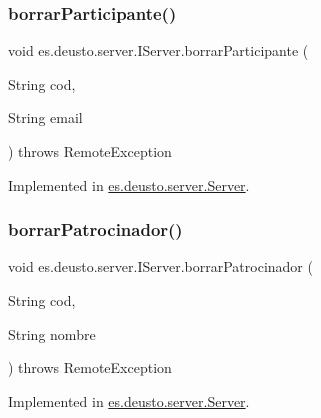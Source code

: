 \mbox{\label{interfacees_1_1deusto_1_1server_1_1_i_server_ac833d9018ade9c49677942317f270046}} 
\subsubsection{\texorpdfstring{borrarParticipante()}{borrarParticipante()}}
{\footnotesize\ttfamily void es.\+deusto.\+server.\+I\+Server.\+borrar\+Participante (\begin{DoxyParamCaption}\item[{String}]{cod,  }\item[{String}]{email }\end{DoxyParamCaption}) throws Remote\+Exception}



Implemented in \mbox{\hyperlink{classes_1_1deusto_1_1server_1_1_server_a60cba3edcdffc7f50d4fa1f55b54ce76}{es.\+deusto.\+server.\+Server}}.

\mbox{\label{interfacees_1_1deusto_1_1server_1_1_i_server_a905d4eb57bc276240c23f5ebb0f08bea}} 
\subsubsection{\texorpdfstring{borrarPatrocinador()}{borrarPatrocinador()}}
{\footnotesize\ttfamily void es.\+deusto.\+server.\+I\+Server.\+borrar\+Patrocinador (\begin{DoxyParamCaption}\item[{String}]{cod,  }\item[{String}]{nombre }\end{DoxyParamCaption}) throws Remote\+Exception}



Implemented in \mbox{\hyperlink{classes_1_1deusto_1_1server_1_1_server_ae8d6c0fcd5fd2412451c9abcd7927b3d}{es.\+deusto.\+server.\+Server}}.

\mbox{\label{interfacees_1_1deusto_1_1server_1_1_i_server_a864d05d99ec3891208c39d8352221656}} 
